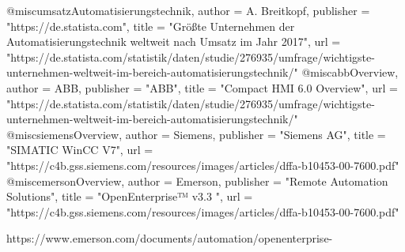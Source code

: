 @misc{umsatzAutomatisierungstechnik,
  author = {A. Breitkopf},
  publisher = "https://de.statista.com",
  title = "Größte Unternehmen der Automatisierungstechnik weltweit nach Umsatz im Jahr 2017",
  url = "https://de.statista.com/statistik/daten/studie/276935/umfrage/wichtigste-unternehmen-weltweit-im-bereich-automatisierungstechnik/"
}
@misc{abbOverview,
  author = {ABB},
  publisher = "ABB",
  title = "Compact HMI 6.0 Overview",
  url = "https://de.statista.com/statistik/daten/studie/276935/umfrage/wichtigste-unternehmen-weltweit-im-bereich-automatisierungstechnik/"
}
@misc{siemensOverview,
  author = {Siemens},
  publisher = "Siemens AG",
  title = "SIMATIC WinCC V7",
  url = "https://c4b.gss.siemens.com/resources/images/articles/dffa-b10453-00-7600.pdf"
}
@misc{emersonOverview,
  author = {Emerson},
  publisher = "Remote Automation Solutions",
  title = "OpenEnterprise™ v3.3 ",
  url = "https://c4b.gss.siemens.com/resources/images/articles/dffa-b10453-00-7600.pdf"
}

https://www.emerson.com/documents/automation/openenterprise-%